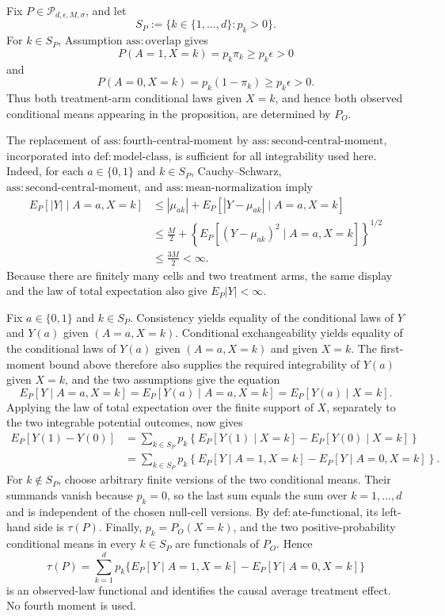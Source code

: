 Fix \(P\in\mathcal P_{d,\epsilon,M,\sigma}\), and let
\[
S_P:=\{k\in\{1,\ldots,d\}:p_k>0\}.
\]
For \(k\in S_P\), Assumption \(\mathrm{ass:overlap}\) gives
\[
P(A=1,X=k)=p_k\pi_k\ge p_k\epsilon>0
\]
and
\[
P(A=0,X=k)=p_k(1-\pi_k)\ge p_k\epsilon>0.
\]
Thus both treatment-arm conditional laws given \(X=k\), and hence both observed conditional means appearing in the proposition, are determined by \(P_O\).

The replacement of \(\mathrm{ass:fourth\text{-}central\text{-}moment}\) by \(\mathrm{ass:second\text{-}central\text{-}moment}\), incorporated into \(\mathrm{def:model\text{-}class}\), is sufficient for all integrability used here.  Indeed, for each \(a\in\{0,1\}\) and \(k\in S_P\), Cauchy--Schwarz, \(\mathrm{ass:second\text{-}central\text{-}moment}\), and \(\mathrm{ass:mean\text{-}normalization}\) imply
\[
\begin{aligned}
E_P[|Y|\mid A=a,X=k]
&\le |\mu_{ak}|+E_P[|Y-\mu_{ak}|\mid A=a,X=k]\\
&\le \frac M2+
\left\{E_P[(Y-\mu_{ak})^2\mid A=a,X=k]\right\}^{1/2}\\
&\le \frac{3M}{2}<\infty.
\end{aligned}
\]
Because there are finitely many cells and two treatment arms, the same display and the law of total expectation also give \(E_P|Y|<\infty\).

Fix \(a\in\{0,1\}\) and \(k\in S_P\).  Consistency yields equality of the conditional laws of \(Y\) and \(Y(a)\) given \((A=a,X=k)\).  Conditional exchangeability yields equality of the conditional laws of \(Y(a)\) given \((A=a,X=k)\) and given \(X=k\).  The first-moment bound above therefore also supplies the required integrability of \(Y(a)\) given \(X=k\), and the two assumptions give the equation
\[
E_P[Y\mid A=a,X=k]
=E_P[Y(a)\mid A=a,X=k]
=E_P[Y(a)\mid X=k].
\]
Applying the law of total expectation over the finite support of \(X\), separately to the two integrable potential outcomes, now gives
\[
\begin{aligned}
E_P[Y(1)-Y(0)]
&=\sum_{k\in S_P}p_k
\left\{E_P[Y(1)\mid X=k]-E_P[Y(0)\mid X=k]\right\}\\
&=\sum_{k\in S_P}p_k
\left\{E_P[Y\mid A=1,X=k]-E_P[Y\mid A=0,X=k]\right\}.
\end{aligned}
\]
For \(k\notin S_P\), choose arbitrary finite versions of the two conditional means.  Their summands vanish because \(p_k=0\), so the last sum equals the sum over \(k=1,\ldots,d\) and is independent of the chosen null-cell versions.  By \(\mathrm{def:ate\text{-}functional}\), its left-hand side is \(\tau(P)\).  Finally, \(p_k=P_O(X=k)\), and the two positive-probability conditional means in every \(k\in S_P\) are functionals of \(P_O\).  Hence
\[
\tau(P)=\sum_{k=1}^{d}p_k\{E_P[Y\mid A=1,X=k]-E_P[Y\mid A=0,X=k]\}
\]
is an observed-law functional and identifies the causal average treatment effect.  No fourth moment is used.